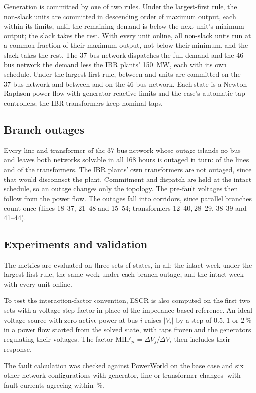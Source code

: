 Generation is committed by one of two rules. Under the largest-first rule, the non-slack units
are committed in descending order of maximum output, each within its limits, until the remaining
demand is below the next unit's minimum output; the slack takes the rest. With every unit online,
all non-slack units run at a common fraction of their maximum output, not below their minimum,
and the slack takes the rest. The 37-bus network dispatches the full demand and the 46-bus
network the demand less the IBR plants' 150~MW, each with its own schedule. Under the largest-first
rule, between \NumUnitsFewestNoIBR{} and \NumUnitsMostNoIBR{} units are committed on the 37-bus
network and between \NumUnitsFewestIBR{} and \NumUnitsMostIBR{} on the 46-bus network. Each
state is a Newton--Raphson power flow with generator reactive limits and the case's automatic tap
controllers; the IBR transformers keep nominal taps.

\subsection{Branch outages}

Every line and transformer of the 37-bus network whose outage islands no bus and leaves both
networks solvable in all 168 hours is outaged in turn: \NumLinesOut{} of the \NumLinesAll{} lines
and \NumTransformersOut{} of the \NumTransformersAll{} transformers. The IBR plants' own transformers are not outaged,
since that would disconnect the plant. Commitment and dispatch are held at the intact schedule, so an outage changes only the topology. The pre-fault voltages then follow from the power flow. 
The \NumOutages{} outages fall into \NumCorridors{} corridors, since parallel branches count once
(lines 18--37, 21--48 and 15--54; transformers 12--40, 28--29, 38--39 and 41--44).

\subsection{Experiments and validation}

The metrics are evaluated on three sets of states, \NumStates{} in all: the intact week under the
largest-first rule, the same week under each branch outage, and the intact week with every unit
online.

To test the interaction-factor convention, ESCR is also computed on the first two sets with a
voltage-step factor in place of the impedance-based reference. An ideal voltage source with zero
active power at bus $i$ raises $|V_i|$ by a step of 0.5, 1 or 2\,\% in a power flow started
from the solved state, with taps frozen and the generators regulating their voltages. The factor
$\mathrm{MIIF}_{ji} = \Delta V_j/\Delta V_i$ then includes their response.

The fault calculation was checked against PowerWorld on the base case
and six other network configurations with generator, line or transformer changes, with fault currents agreeing within \NumPowerWorldMaxErrorPct\,\%.
